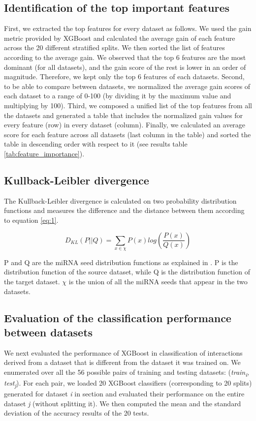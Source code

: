 \documentclass{bmcart}
\begin{document}
\subsection*{Identification of the top important features}
First, we extracted the top features for every dataset as follows. We used the gain metric provided by XGBoost and calculated the average gain of each feature across the 20 different stratified splits. We then sorted the list of features according to the average gain. We observed that the top 6 features are the most dominant (for all datasets), and the gain score of the rest is lower in an order of magnitude. Therefore, we kept only the top 6 features of each datasets.  
Second, to be able to compare between datasets, we normalized the average gain scores of each dataset to a range of 0-100 (by dividing it by the maximum value and multiplying by 100). 
Third, we composed a unified list of the top features from all the datasets and generated a table that includes the normalized gain values for every feature (row) in every dataset (column). Finally, we calculated an average score for each feature across all datasets (last column in the table) and sorted the table in descending order with respect to it (see results table \ref{tab:feature_importance}).

\subsection*{Kullback-Leibler divergence}
The Kullback-Leibler divergence is calculated on two probability distribution functions and measures the difference and the distance between them according to equation \ref{eq:1}.

\begin{equation}
 D_{KL} \left (P ||Q \right ) = \sum_{x\in \chi }{P\left ( x \right )log\left ( \frac{P\left ( x \right )}{Q\left ( x \right )} \right )}\label{eq:1}
\end{equation}

P and Q are the miRNA seed distribution functions as explained in . P is the distribution function of the source dataset, while Q is the distribution function of the target dataset. $\chi$ is the union of all the miRNA seeds that appear in the two datasets.

\subsection*{Evaluation of the classification performance between datasets}
We next evaluated the performance of XGBoost in classification of interactions derived from a dataset that is different from the dataset it was trained on. We enumerated over all the 56 possible pairs of training and testing datasets: (\textit{train\textsubscript{i}, test\textsubscript{j}}). For each pair, we loaded 20 XGBoost classifiers (corresponding to 20 splits) generated for dataset \textit{i} in section  and evaluated their performance on the entire dataset \textit{j} (without splitting it). We then computed the mean and the standard deviation of the accuracy results of the 20 tests.
\end{document}
